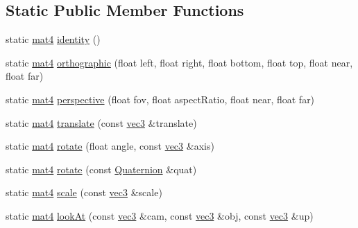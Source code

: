 \subsection*{Static Public Member Functions}
\begin{DoxyCompactItemize}
\item 
static \hyperlink{structspork_1_1maths_1_1mat4}{mat4} \hyperlink{structspork_1_1maths_1_1mat4_a845d42d6162116afe3bd2397523c2f15}{identity} ()
\item 
static \hyperlink{structspork_1_1maths_1_1mat4}{mat4} \hyperlink{structspork_1_1maths_1_1mat4_a689cf66fadd19f1be45c3096a09044fc}{orthographic} (float left, float right, float bottom, float top, float near, float far)
\item 
static \hyperlink{structspork_1_1maths_1_1mat4}{mat4} \hyperlink{structspork_1_1maths_1_1mat4_afbbc5c7795b2a312c9aef93120695a6f}{perspective} (float fov, float aspect\+Ratio, float near, float far)
\item 
static \hyperlink{structspork_1_1maths_1_1mat4}{mat4} \hyperlink{structspork_1_1maths_1_1mat4_a7a212d97ca3807e61d6a0aa7df904b35}{translate} (const \hyperlink{structspork_1_1maths_1_1vec3}{vec3} \&translate)
\item 
static \hyperlink{structspork_1_1maths_1_1mat4}{mat4} \hyperlink{structspork_1_1maths_1_1mat4_ab47cf3486703b158744c77b8273bcb5b}{rotate} (float angle, const \hyperlink{structspork_1_1maths_1_1vec3}{vec3} \&axis)
\item 
static \hyperlink{structspork_1_1maths_1_1mat4}{mat4} \hyperlink{structspork_1_1maths_1_1mat4_ae8eab0264126ec8bcee502727f705b2a}{rotate} (const \hyperlink{structspork_1_1maths_1_1_quaternion}{Quaternion} \&quat)
\item 
static \hyperlink{structspork_1_1maths_1_1mat4}{mat4} \hyperlink{structspork_1_1maths_1_1mat4_a6d42d521e673886f906c6bef2600a5b6}{scale} (const \hyperlink{structspork_1_1maths_1_1vec3}{vec3} \&scale)
\item 
static \hyperlink{structspork_1_1maths_1_1mat4}{mat4} \hyperlink{structspork_1_1maths_1_1mat4_ab9fb102f6e628b289edfe09e4b9ffe04}{look\+At} (const \hyperlink{structspork_1_1maths_1_1vec3}{vec3} \&cam, const \hyperlink{structspork_1_1maths_1_1vec3}{vec3} \&obj, const \hyperlink{structspork_1_1maths_1_1vec3}{vec3} \&up)
\end{DoxyCompactItemize}
